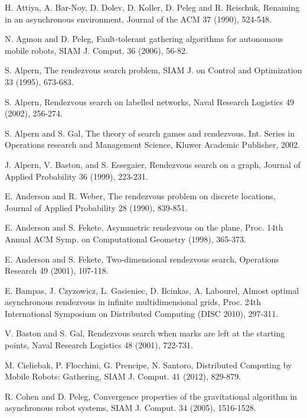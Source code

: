 \documentclass [11pt] {article}
\begin{document}

\begin{thebibliography}{99}

H. Attiya, A. Bar-Noy, D. Dolev, D. Koller, D. Peleg and R. Reischuk,
Renaming in an asynchronous environment, Journal of the ACM 37 (1990), 524-548.

N. Agmon and D. Peleg, 
Fault-tolerant gathering algorithms for autonomous mobile robots,  
SIAM J. Comput. 36 (2006), 56-82. 

S. Alpern,
The rendezvous search problem,
SIAM J. on Control and Optimization 33 (1995), 673-683.


S. Alpern,
Rendezvous search on labelled networks,
Naval Research Logistics 49 (2002), 256-274.

S. Alpern and S. Gal,
The theory of search games and rendezvous.
Int. Series in Operations research and Management Science,
Kluwer Academic Publisher, 2002.

J. Alpern, V. Baston, and S. Essegaier,
Rendezvous search on a graph,
Journal of Applied Probability 36 (1999), 223-231.



E. Anderson and R. Weber,
The rendezvous problem on discrete locations,
Journal of Applied Probability 28 (1990), 839-851.

E. Anderson and S. Fekete,
Asymmetric rendezvous on the plane,
Proc. 14th Annual ACM Symp. on Computational Geometry (1998), 365-373.

E. Anderson and S. Fekete,
Two-dimensional rendezvous search,
Operations Research 49 (2001), 107-118.




E. Bampas, J. Czyzowicz, L. Gasieniec, D. Ilcinkas, A. Labourel, Almost optimal asynchronous rendezvous in infinite multidimensional grids,
Proc. 24th International Symposium on Distributed Computing (DISC 2010),  297-311.

V. Baston and S. Gal,
Rendezvous search when marks are left at the starting
points,
Naval Research Logistics 48 (2001), 722-731.

{
M. Cieliebak, P. Flocchini, G. Prencipe, N. Santoro, 
Distributed Computing by Mobile Robots: Gathering,
SIAM J. Comput. 41 (2012),  829-879.}

R. Cohen and D. Peleg, 
Convergence properties of the gravitational algorithm in asynchronous robot 
systems, SIAM J. Comput. 34 (2005), 1516-1528. 


\end{thebibliography}
\end{document}
